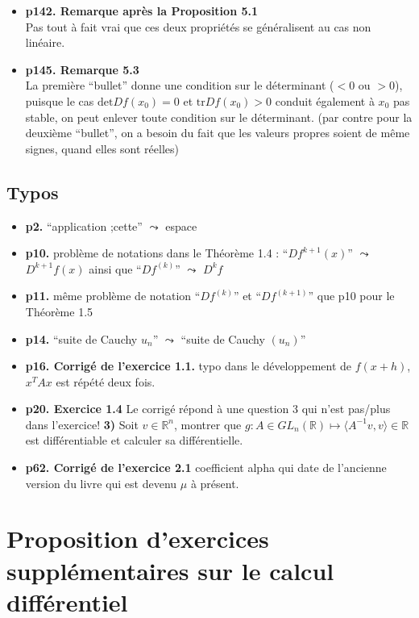\documentclass[11pt,a4paper]{article}
\newcommand{\vide}{\Large $\square$}
\begin{document}
\begin{itemize}
    \item[\vide] \textbf{p142. Remarque après la Proposition 5.1} \\
        Pas tout à fait vrai que ces deux propriétés se généralisent au cas non linéaire.
    
    \item[\vide] \textbf{p145. Remarque 5.3} \\
        La première ``bullet'' donne une condition sur le déterminant ($< 0$ ou $> 0$), puisque le cas $\mathrm{det} Df(x_0) = 0$ et $\mathrm{tr} Df(x_0) > 0$ conduit également à $x_0$ pas stable, on peut enlever toute condition sur le déterminant. (par contre pour la deuxième ``bullet'', on a besoin du fait que les valeurs propres soient de même signes, quand elles sont réelles)
\end{itemize}

\subsection{Typos}

\begin{itemize}
    \item[\vide] \textbf{p2.} ``application ;cette'' $\leadsto$ espace
    \item[\vide] \textbf{p10.} problème de notations dans le Théorème 1.4 : ``$D f^{k+1}(x)$'' $\leadsto$ $D^{k+1} f(x)$ ainsi que ``$Df^{(k)}$'' $\leadsto$ $D^{k}f$
    \item[\vide] \textbf{p11.} même problème de notation ``$D f^{(k)}$'' et ``$D f^{(k+1)}$'' que p10 pour le Théorème 1.5
    \item[\vide] \textbf{p14.} ``suite de Cauchy $u_n$'' $\leadsto$ ``suite de Cauchy $(u_n)$''
    \item[\vide] \textbf{p16. Corrigé de l'exercice 1.1.} typo dans le développement de $f(x + h)$, $x^T A x$ est répété deux fois.
    \item[\vide] \textbf{p20. Exercice 1.4} Le corrigé répond à une question 3 qui n'est pas/plus dans l'exercice! \textbf{3)} Soit $v \in \mathbb R^n$, montrer que $g : A \in GL_n(\mathbb R) \mapsto \langle A^{-1}v, v\rangle \in \mathbb R$ est différentiable et calculer sa différentielle.  
    \item[\vide] \textbf{p62. Corrigé de l'exercice 2.1} coefficient alpha qui date de l'ancienne version du livre qui est devenu $\mu$ à présent. 
\end{itemize}


\section{Proposition d'exercices supplémentaires sur le calcul différentiel}
\end{document}
